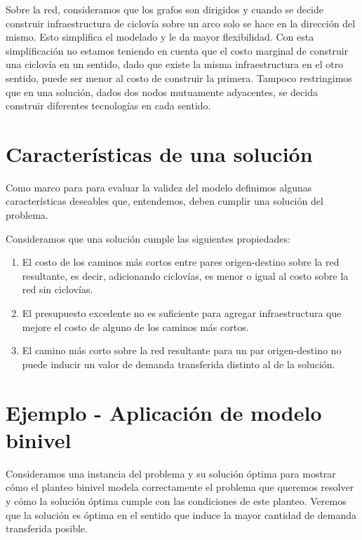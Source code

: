 Sobre la red, consideramos que los grafos son dirigidos y cuando se decide construir infraestructura de ciclovía sobre un arco solo se hace en la dirección del mismo. Esto simplifica el modelado y le da mayor flexibilidad. Con esta simplificación no estamos teniendo en cuenta que el costo marginal de construir una ciclovía en un sentido, dado que existe la misma infraestructura en el otro sentido, puede ser menor al costo de construir la primera. Tampoco restringimos que en una solución, dados dos nodos mutuamente adyacentes, se decida construir diferentes tecnologías en cada sentido.

\section{Características de una solución}
\label{sect:solutioncharacteristics}

Como marco para para evaluar la validez del modelo definimos algunas características deseables que, entendemos, deben cumplir una solución del problema.

Consideramos que una solución cumple las siguientes propiedades:

\begin{enumerate}
    \item{El costo de los caminos más cortos entre pares origen-destino sobre la red resultante, es decir, adicionando ciclovías, es menor o igual al costo sobre la red sin ciclovías.}
  \item{\label{budgetexcess} El presupuesto excedente no es suficiente para agregar infraestructura que mejore el costo de alguno de los caminos más cortos.}
  \item{El camino más corto sobre la red resultante para un par origen-destino no puede inducir un valor de demanda transferida distinto al de la solución.}
\end{enumerate}

\section{Ejemplo - Aplicación de modelo binivel}
\label{sect:example1}

Consideramos una instancia del problema y su solución óptima para mostrar cómo el planteo binivel modela correctamente el problema que queremos resolver y cómo la solución óptima cumple con las condiciones de este planteo. Veremos que la solución es óptima en el sentido que induce la mayor cantidad de demanda transferida posible.


